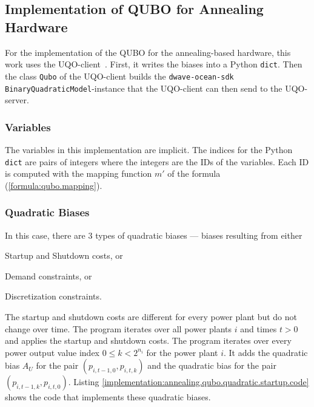 \subsection{Implementation of QUBO for Annealing Hardware}
\label{implementation:annealing.qubo}

For the implementation of the QUBO for the annealing-based hardware, this work uses the UQO-client~\cite{UQOPyPI, UQOGitHub}.
First, it writes the biases into a Python \texttt{dict}.
Then the class \texttt{Qubo} of the UQO-client builds the \texttt{dwave-ocean-sdk} \texttt{BinaryQuadraticModel}-instance that the UQO-client can then send to the UQO-server.

\subsubsection{Variables}
\label{implementation:annealing.qubo.variables}

The variables in this implementation are implicit.
The indices for the Python \texttt{dict} are pairs of integers where the integers are the IDs of the variables.
Each ID is computed with the mapping function $m'$ of the formula (\ref{formula:qubo.mapping}).

\subsubsection{Quadratic Biases}
\label{implementation:annealing.qubo.quadratic}

In this case, there are $3$ types of quadratic biases --- biases resulting from either
\begin{enumerate*}[label=(\roman*)]
  \item Startup and Shutdown costs, or
  \item Demand constraints, or
  \item Discretization constraints.
\end{enumerate*}

The startup and shutdown costs are different for every power plant but do not change over time.
The program iterates over all power plants $i$ and times $t > 0$ and applies the startup and shutdown costs.
The program iterates over every power output value index $0 \leq k < 2^{n_i}$ for the power plant $i$.
It adds the quadratic bias $A_U$ for the pair $(p_{i, t-1, 0}, p_{i, t, k})$ and the quadratic bias for the pair $(p_{i, t-1, k}, p_{i, t, 0})$.
Listing \ref{implementation:annealing.qubo.quadratic.startup.code} shows the code that implements these quadratic biases.

